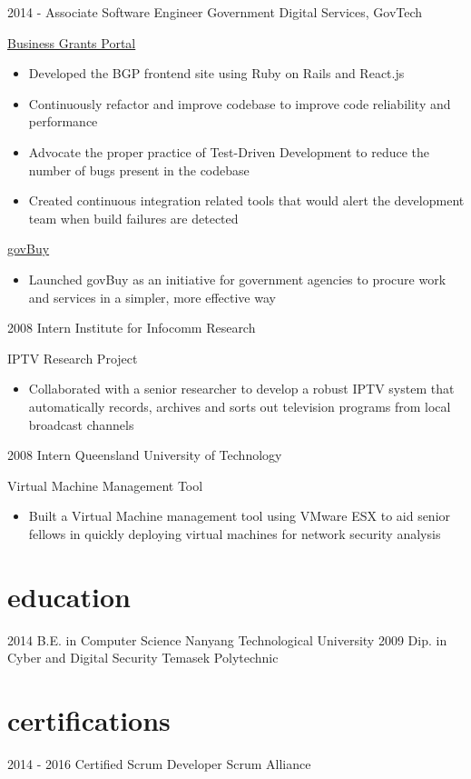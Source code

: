 \documentclass[]{friggeri-jj-cv}
\begin{document}
\begin{entrylist}
  \entry
    {2014 -}
    {Associate Software Engineer}
    {Government Digital Services, GovTech}
    {\href{https://www.businessgrants.gov.sg/}{Business Grants Portal}
    \begin{itemize}
    \item Developed the BGP frontend site using Ruby on Rails and React.js
    \item Continuously refactor and improve codebase to improve code reliability and performance
    \item Advocate the proper practice of Test-Driven Development to reduce the number of bugs present in the codebase
    \item Created continuous integration related tools that would alert the development team when build failures
    are detected
    \end{itemize}
    \href{https://buy.gds-gov.tech/}{govBuy}
    \begin{itemize}
    \item Launched govBuy as an initiative for government agencies to procure work and services in a simpler,
    more effective way
    \end{itemize}}
  \entry
    {2008}
    {Intern}
    {Institute for Infocomm Research}
    {IPTV Research Project
    \begin{itemize}
    \item Collaborated with a senior researcher to develop a robust IPTV system that automatically records,
    archives and sorts out television programs from local broadcast channels
    \end{itemize}}
  \entry
  {2008}
  {Intern}
  {Queensland University of Technology}
  {Virtual Machine Management Tool
  \begin{itemize}
  \item Built a Virtual Machine management tool using VMware ESX to aid
  senior fellows in quickly deploying
  virtual machines for network security analysis
  \end{itemize}}

\end{entrylist}

\section{education}

\begin{entrylist}
  \entry
    {2014}
    {B.E. {\normalfont in Computer Science}}
    {Nanyang Technological University}
    {}
  \entry
    {2009}
    {Dip. {\normalfont in Cyber and Digital Security}}
    {Temasek Polytechnic}
    {}
\end{entrylist}

\section{certifications}

\begin{entrylist}
  \entry
    {2014 - 2016}
    {Certified Scrum Developer}
    {Scrum Alliance}
    {}
\end{entrylist}


\end{document}
